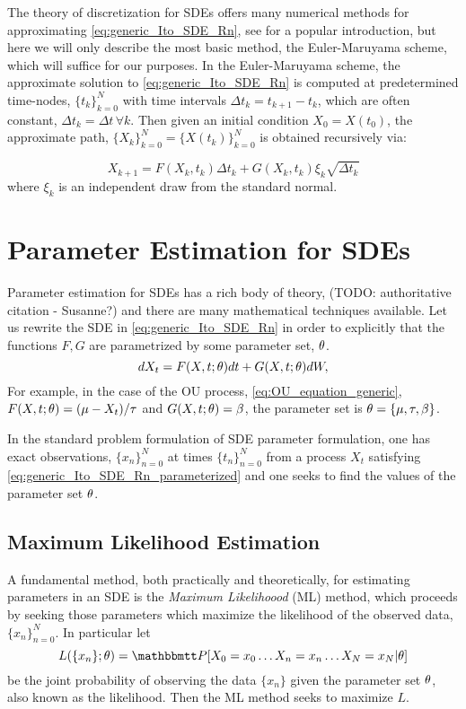 The theory of discretization for SDEs offers many numerical methods for
approximating \cref{eq:generic_Ito_SDE_Rn}, see \cite{Higham2001} for a popular
introduction, but here we will only describe the most basic method, the Euler-Maruyama scheme, which will suffice for our
purposes. In the Euler-Maruyama scheme, the approximate solution to
\cref{eq:generic_Ito_SDE_Rn} is computed at predetermined time-nodes,
$\{t_k\}_{k=0}^N$ with time intervals $\Delta t_k = t_{k+1} - t_{k }$, which
are often constant, $\Delta t_k = \Delta t\, \forall k$. Then given an initial
condition $X_0 = X(t_0)$, the approximate path, $\{X_k\}_{k=0}^N =
\{X(t_k)\}_{k=0}^N$ is obtained recursively via:

\begin{equation}
X_{k+1} = F(X_k,t_k)  \Delta t_k   + G(X_k,t_k) \xi_k \sqrt{\Delta t_k }
\label{eq:euler_maruyama_discretization_generic_Ito_SDE}
\end{equation}
where $\xi_k$ is an independent draw from the standard normal. 



\section{Parameter Estimation for SDEs}
\label{sec:estimation}
Parameter estimation for SDEs has a rich body of theory, (TODO: authoritative
citation - Susanne?)  and there are many mathematical techniques
available. Let us rewrite the SDE in \cref{eq:generic_Ito_SDE_Rn} in order to explicitly that the 
functions $F, G$ are parametrized by some parameter set, ${ \theta}$.
\begin{equation}
dX_t = F(X,t;{ \theta}) dt + G(X,t;{ \theta}) dW,
\label{eq:generic_Ito_SDE_Rn_parameterized}
\end{equation}
For example, in the case of the OU process, \cref{eq:OU_equation_generic},
$F(X,t;{ \theta}) = ({\mu } - {X_t})/{{ \tau }}$ and $G(X,t;{ \theta}) = \beta$, the
parameter set is ${ \theta} = \{{\mu }, { \tau }, \beta\}$.

In the standard problem formulation of SDE parameter formulation, one has exact
observations, $\{x_n\}_{n=0}^N$ at times $\{t_n\}_{n=0}^N$ from a process $X_t$
satisfying \cref{eq:generic_Ito_SDE_Rn_parameterized} and one seeks to find the
values of the parameter set ${ \theta}$.

\subsection{Maximum Likelihood Estimation}
A fundamental method, both
practically and theoretically, for estimating parameters in an SDE is the {\sl Maximum
Likelihoood} (ML) method, which proceeds by seeking those parameters which
maximize the likelihood of the observed data, $\{x_n\}_{n=0}^N$. In particular
let $$L(\{x_n\}; \th) = \Prob[ X_0 = x_0\ldots X_n = x_n\ldots X_N = x_N |
\th]$$ be the joint probability of observing the data $\{x_n\}$ given the
parameter set ${ \theta}$, also known as the likelihood. Then the ML method seeks to
maximize $L$.

